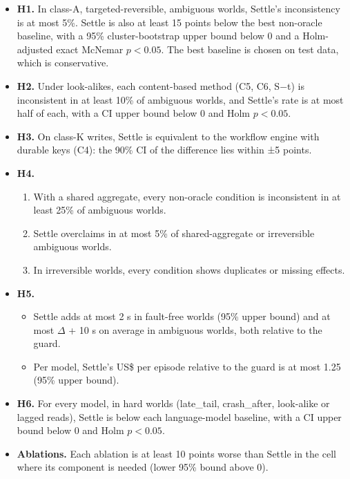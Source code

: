 \documentclass[
  10pt,
]{article}
\providecommand{\tightlist}{%
  \setlength{\itemsep}{0pt}\setlength{\parskip}{0pt}}
\begin{document}
\begin{itemize}
\tightlist
\item
  \textbf{H1.} In class-A, targeted-reversible, ambiguous worlds,
  Settle's inconsistency is at most 5\%. Settle is also at least 15
  points below the best non-oracle baseline, with a 95\%
  cluster-bootstrap upper bound below 0 and a Holm-adjusted exact
  McNemar \(p < 0.05\). The best baseline is chosen on test data, which
  is conservative.
\item
  \textbf{H2.} Under look-alikes, each content-based method (C5, C6,
  S−t) is inconsistent in at least 10\% of ambiguous worlds, and
  Settle's rate is at most half of each, with a CI upper bound below 0
  and Holm \(p < 0.05\).
\item
  \textbf{H3.} On class-K writes, Settle is equivalent to the workflow
  engine with durable keys (C4): the 90\% CI of the difference lies
  within ±5 points.
\item
  \textbf{H4.}

  \begin{enumerate}
  \def\labelenumi{(\alph{enumi})}
  \tightlist
  \item
    With a shared aggregate, every non-oracle condition is inconsistent
    in at least 25\% of ambiguous worlds.
  \item
    Settle overclaims in at most 5\% of shared-aggregate or irreversible
    ambiguous worlds.
  \item
    In irreversible worlds, every condition shows duplicates or missing
    effects.
  \end{enumerate}
\item
  \textbf{H5.}

  \begin{itemize}
  \tightlist
  \item
    Settle adds at most 2 s in fault-free worlds (95\% upper bound) and
    at most \(\Delta\) + 10 s on average in ambiguous worlds, both
    relative to the guard.
  \item
    Per model, Settle's US\$ per episode relative to the guard is at
    most 1.25 (95\% upper bound).
  \end{itemize}
\item
  \textbf{H6.} For every model, in hard worlds (late\_tail,
  crash\_after, look-alike or lagged reads), Settle is below each
  language-model baseline, with a CI upper bound below 0 and Holm
  \(p < 0.05\).
\item
  \textbf{Ablations.} Each ablation is at least 10 points worse than
  Settle in the cell where its component is needed (lower 95\% bound
  above 0).
\end{itemize}
\end{document}
